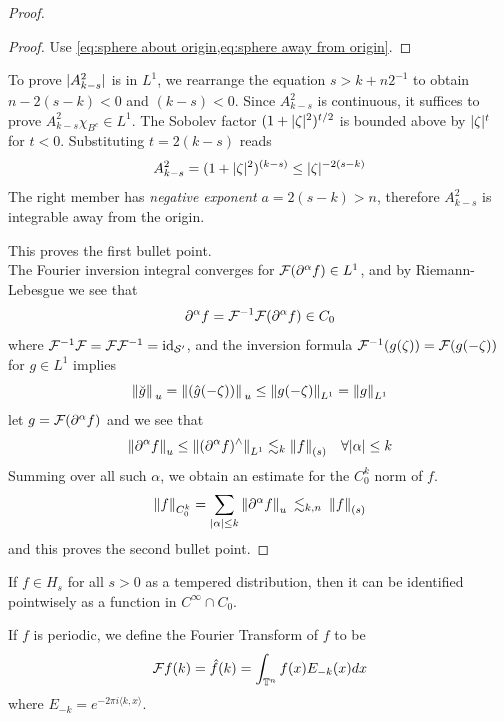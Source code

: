 \documentclass[../main-v2-manifolds.tex]{subfiles}
\begin{document}
\begin{proof}
\begin{note}[Integrability of $C$]
\begin{proof}
    Use \cref{eq:sphere about origin,eq:sphere away from origin}.
\end{proof}
To prove $\vert {A^2_{k-s}} \vert$ is in $L^1$, we rearrange the equation $s> k + n2^{-1}$ to obtain $n - 2(s-k)<0$ and $(k-s)<0$. Since $A^2_{k-s}$ is continuous, it suffices to prove $A^2_{k-s}\chi_{B^c}\in L^1$. The Sobolev factor $(1+\vert {\zeta} \vert^2)^{t/2}$ is bounded above by $\vert {\zeta} \vert^{t}$ for $t<0$. Substituting  $t = 2(k-s)$ reads
\[
    A_{k-s}^2 = (1+\vert {\zeta} \vert^2)^{(k-s)}\leq \vert {\zeta} \vert^{-2(s-k)}
\]
The right member has \emph{negative exponent} $a = 2(s-k) > n$, therefore $A_{k-s}^2$ is integrable away from the origin.
\end{note}

This proves the first bullet point.\\

The Fourier inversion integral converges for $\mathcal{F}(\partial^\alpha f)\in L^1$, and by Riemann-Lebesgue we see that 
\[
\partial^\alpha f=\mathcal{F}^{-1}\mathcal{F}(\partial^\alpha f)\in C_0
\]
where $\mathcal{F}^{-1}\mathcal{F} = \mathcal{F}\mathcal{F}^{-1} = \operatorname{id}_{\mathcal{S}'}$, and the inversion formula $\mathcal{F}^{-1}(g(\zeta)) = \mathcal{F}(g(-\zeta))$ for $g\in L^1$ implies
\[
\norm*{\breve{g}}_u = \norm*{(\hat{g}(-\zeta))}_u\leq \norm{g(-\zeta)}_{L^1}=\norm{g}_{L^1}
\]
let $g = \mathcal{F}(\partial^\alpha f)$ and we see that
\[
\norm{\partial^\alpha f}_u\leq \norm{(\partial^\alpha f)^{\wedge}}_{L^1}\lesssim_k \norm{f}_{(s)}\quad\forall \vert {\alpha} \vert\leq k
\]
Summing over all such $\alpha$, we obtain an estimate for the $C_0^k$ norm of $f$.
\[
\norm{f}_{C_0^k} =\sum_{\vert {\alpha} \vert\leq k}\norm{\partial^\alpha f}_u \:\lesssim_{k,n}\: \norm{f}_{(s)}
\]
and this proves the second bullet point.
\end{proof}
\begin{corollary}
If $f\in H_s$ for all $s>0$ as a tempered distribution, then it can be identified pointwisely as a function in $C^\infty\cap C_0$.
\end{corollary}
If $f$ is periodic, we define the Fourier Transform of $f$ to be
\begin{equation}
    \mathcal{F} f(k) = \hat{f}(k) = \int_{{\mathbb{T}^n}}f(x)E_{-k}(x)dx
    \label{eq:fourier transform torusn l1}
\end{equation}
where $E_{-k} = e^{-2\pi i \langle k, x\rangle}$.\\
\end{document}
